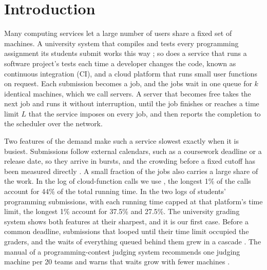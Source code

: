 \providecommand{\devnum}[1]{#1}

\section{Introduction}
\label{sec:intro}

Many computing services let a large number of users share a fixed set of machines. A
university system that compiles and tests every programming assignment its students
submit works this way \cite{wasik2018ojsurvey}; so does a service that runs a software
project's tests each time a developer changes the code, known as continuous integration
(CI), and a cloud platform that runs small user functions on request. Each submission
becomes a job, and the jobs wait in one queue for $k$ identical machines, which we call
servers. A server that becomes free takes the next job and runs it without interruption,
until the job finishes or reaches a time limit $L$ that the service imposes on every job,
and then reports the completion to the scheduler over the network.

Two features of the demand make such a service slowest exactly when it is busiest.
Submissions follow external calendars, such as a coursework deadline or a release date,
so they arrive in bursts, and the crowding before a fixed cutoff has been measured
directly \cite{konig2005deadline,alfi2007deadline,alfi2009deadline}. A small fraction of
the jobs also carries a large share of the work. In the log of cloud-function calls we use
\cite{azure2021trace,zhang2021harvested}, the longest \devnum{1\%} of the calls account for
\devnum{44\%} of the total running time. In the two logs of students' programming
submissions, with each running time capped at that platform's time limit, the longest
\devnum{1\%} account for \devnum{37.5\%} and \devnum{27.5\%}. The university grading system shows both
features at their sharpest, and it is our first case. Before a common deadline,
submissions that looped until their time limit occupied the graders, and the waits of
everything queued behind them grew in a cascade \cite{peveler2019sandbox}. The manual of a
programming-contest judging system recommends one judging machine per 20 teams and warns
that waits grow with fewer machines \cite{domjudge_manual}.

